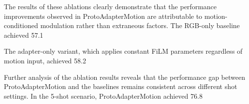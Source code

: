 \documentclass[11pt]{article}
\begin{document}
The results of these ablations clearly demonstrate that the performance improvements observed in ProtoAdapterMotion are attributable to motion-conditioned modulation rather than extraneous factors. The RGB-only baseline achieved 57.1%

The adapter-only variant, which applies constant FiLM parameters regardless of motion input, achieved 58.2%

Further analysis of the ablation results reveals that the performance gap between ProtoAdapterMotion and the baselines remains consistent across different shot settings. In the 5-shot scenario, ProtoAdapterMotion achieved 76.8%
\end{document}

